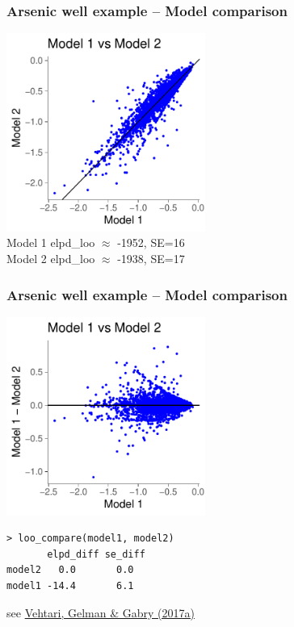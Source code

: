 \documentclass[10pt]{beamer}
\begin{document}
\begin{frame}

\frametitle{Arsenic well example -- Model comparison}

  {\includegraphics[width=6.5cm]{figs/arsenicelpdloo.pdf}}
  \\
  {Model 1 elpd\_loo $\approx$ -1952, SE=16\\
  Model 2 elpd\_loo $\approx$ -1938, SE=17}

\end{frame}

\begin{frame}[fragile]

\frametitle{Arsenic well example -- Model comparison}

  {\includegraphics[width=6.5cm]{figs/arsenicelpddiff.pdf}}
  \\
  {\scriptsize
\begin{lstlisting}
> loo_compare(model1, model2)
       elpd_diff se_diff
model2   0.0       0.0
model1 -14.4       6.1
\end{lstlisting}}
\vspace{-\baselineskip}
    {\scriptsize \hspace{6cm} see \href{http://link.springer.com/article/10.1007/s11222-016-9696-4}{Vehtari, Gelman \& Gabry (2017a)}}

\end{frame}
\end{document}
